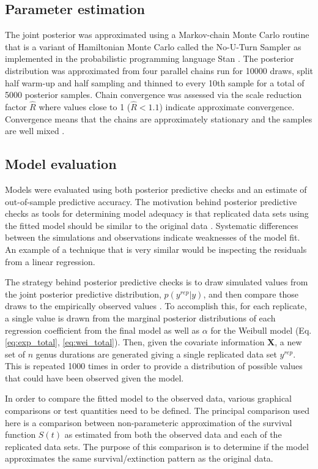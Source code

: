 \documentclass[12pt,letterpaper]{article}
\begin{document}
\subsection{Parameter estimation}
The  joint posterior was approximated using a Markov-chain Monte Carlo routine that is a variant of Hamiltonian Monte Carlo called the No-U-Turn Sampler \citep{Hoffman2014} as implemented in the probabilistic programming language Stan \citep{2014stan}. The posterior distribution was approximated from four parallel chains run for 10000 draws, split half warm-up and half sampling and thinned to every 10th sample for a total of 5000 posterior samples. Chain convergence was assessed via the scale reduction factor \(\hat{R}\) where values close to 1 (\(\hat{R} < 1.1\)) indicate approximate convergence. Convergence means that the chains are approximately stationary and the samples are well mixed \citep{Gelman2013d}.


\subsection{Model evaluation}

Models were evaluated using both posterior predictive checks and an estimate of out-of-sample predictive accuracy. The motivation behind posterior predictive checks as tools for determining model adequacy is that replicated data sets using the fitted model should be similar to the original data \citep{Gelman2013d}. Systematic differences between the simulations and observations indicate weaknesses of the model fit. An example of a technique that is very similar would be inspecting the residuals from a linear regression.

The strategy behind posterior predictive checks is to draw simulated values from the joint posterior predictive distribution, \(p(y^{rep} | y)\), and then compare those draws to the empirically observed values \citep{Gelman2013d}. To accomplish this, for each replicate, a single value is drawn from the marginal posterior distributions of each regression coefficient from the final model as well as \(\alpha\) for the Weibull model (Eq. \ref{eq:exp_total}, \ref{eq:wei_total}). Then, given the covariate information \(\mathbf{X}\), a new set of \(n\) genus durations are generated giving a single replicated data set \(y^{rep}\). This is repeated 1000 times in order to provide a distribution of possible values that could have been observed given the model. 

In order to compare the fitted model to the observed data, various graphical comparisons or test quantities need to be defined. The principal comparison used here is a comparison between non-parameteric approximation of the survival function \(S(t)\) as estimated from both the observed data and each of the replicated data sets. The purpose of this comparison is to determine if the model approximates the same survival/extinction pattern as the original data. 
\end{document}
